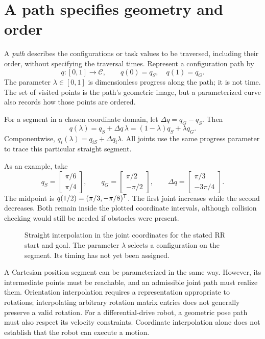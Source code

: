 \section{A path specifies geometry and order}
A \emph{path} describes the configurations or task values to be traversed,
including their order, without specifying the traversal times. Represent
a configuration path by
\begin{equation}
 q:[0,1]\longrightarrow\mathcal C,\qquad
 q(0)=q_S,\quad q(1)=q_G.
 \label{eq:l12-path}
\end{equation}
The parameter $\lambda\in[0,1]$ is dimensionless progress along the path;
it is not time. The set of visited points is the path's geometric image,
but a parameterized curve also records how those points are ordered.

For a segment in a chosen coordinate domain, let $\Delta q=q_G-q_S$.
Then
\begin{equation}
 \boxed{q(\lambda)=q_S+\Delta q\,\lambda
 =(1-\lambda)q_S+\lambda q_G.}
 \label{eq:l12-segment}
\end{equation}
Componentwise, $q_i(\lambda)=q_{iS}+\Delta q_i\lambda$. All joints use
the same progress parameter to trace this particular straight segment.

As an example, take
\[
 q_S=\begin{bmatrix}\pi/6\\\pi/4\end{bmatrix},\qquad
 q_G=\begin{bmatrix}\pi/2\\-\pi/2\end{bmatrix},\qquad
 \Delta q=\begin{bmatrix}\pi/3\\-3\pi/4\end{bmatrix}.
\]
The midpoint is $q(1/2)=(\pi/3,-\pi/8)^{\mathsf T}$. The first joint increases
while the second decreases. Both remain inside the plotted coordinate
intervals, although collision checking would still be needed if obstacles
were present.

\begin{figure}[htbp]
\centering
\caption{Straight interpolation in the joint coordinates for the stated
RR start and goal. The parameter $\lambda$ selects a configuration on the
segment. Its timing has not yet been assigned.}
\label{fig:l12-segment}
\end{figure}

A Cartesian position segment can be parameterized in the same way.
However, its intermediate points must be reachable, and an admissible
joint path must realize them. Orientation interpolation requires a
representation appropriate to rotations; interpolating arbitrary rotation
matrix entries does not generally preserve a valid rotation.
For a differential-drive robot, a geometric pose path must also respect
its velocity constraints. Coordinate interpolation alone does not establish
that the robot can execute a motion.

